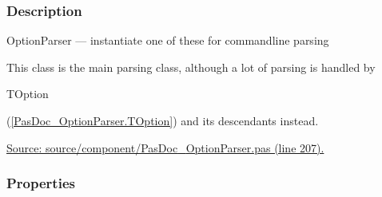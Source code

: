\documentclass{report}
\begin{document}
\subsubsection*{\large{\textbf{Description}}\normalsize\hspace{1ex}\hfill}
OptionParser --- instantiate one of these for commandline parsing\hfill\vspace*{1ex}

 This class is the main parsing class, although a lot of parsing is handled by \begin{ttfamily}TOption\end{ttfamily}(\ref{PasDoc_OptionParser.TOption}) and its descendants instead.\par
\href{https://github.com/pasdoc/pasdoc/blob/master/source/component/PasDoc_OptionParser.pas#L207}{Source: source/component/PasDoc{\_}OptionParser.pas (line 207).}\subsubsection*{\large{\textbf{Properties}}\normalsize\hspace{1ex}\hfill}
\end{document}
